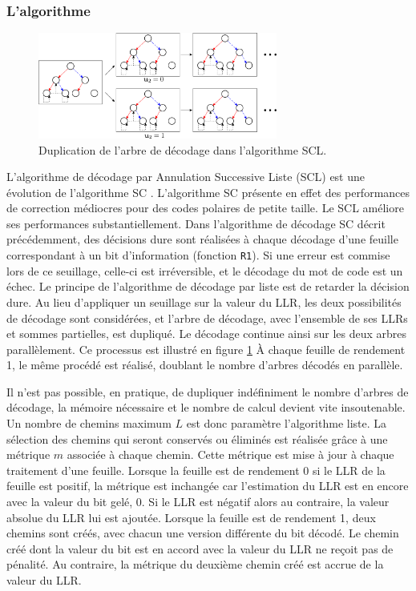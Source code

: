 \subsubsection{L'algorithme}
\begin{figure}[t]
\centering
\includegraphics[width=0.7\textwidth]{main/ch1_fig/scl}
\caption{Duplication de l'arbre de décodage dans l'algorithme SCL.}
\label{fig:scl}
\end{figure}
L'algorithme de décodage par Annulation Successive Liste (SCL) est une évolution de l'algorithme SC \cite{tal_how_2013}. L'algorithme SC présente en effet des performances de correction médiocres pour des codes polaires de petite taille. Le SCL améliore ses performances substantiellement. Dans l'algorithme de décodage SC décrit précédemment, des décisions dure sont réalisées à chaque décodage d'une feuille correspondant à un bit d'information (fonction \texttt{R1}). Si une erreur est commise lors de ce seuillage, celle-ci est irréversible, et le décodage du mot de code est un échec. Le principe de l'algorithme de décodage par liste est de retarder la décision dure. Au lieu d'appliquer un seuillage sur la valeur du LLR, les deux possibilités de décodage sont considérées, et l'arbre de décodage, avec l'ensemble de ses LLRs et sommes partielles, est dupliqué. Le décodage continue ainsi sur les deux arbres parallèlement. Ce processus est illustré en figure \ref{fig:scl} \`A chaque feuille de rendement 1, le même procédé est réalisé, doublant le nombre d'arbres décodés en parallèle.

Il n'est pas possible, en pratique, de dupliquer indéfiniment le nombre d'arbres de décodage, la mémoire nécessaire et le nombre de calcul devient vite insoutenable. Un nombre de chemins maximum $L$ est donc paramètre l'algorithme liste. La sélection des chemins qui seront conservés ou éliminés est réalisée grâce à une métrique $m$ associée à chaque chemin. Cette métrique est mise à jour à chaque traitement d'une feuille. Lorsque la feuille est de rendement 0 si le LLR de la feuille est positif, la métrique est inchangée car l'estimation du LLR est en encore avec la valeur du bit gelé, 0. Si le LLR est négatif alors au contraire, la valeur absolue du LLR lui est ajoutée. Lorsque la feuille est de rendement 1, deux chemins sont créés, avec chacun une version différente du bit décodé. Le chemin créé dont la valeur du bit est en accord avec la valeur du LLR ne reçoit pas de pénalité. Au contraire, la métrique du deuxième chemin créé est accrue de la valeur du LLR.

